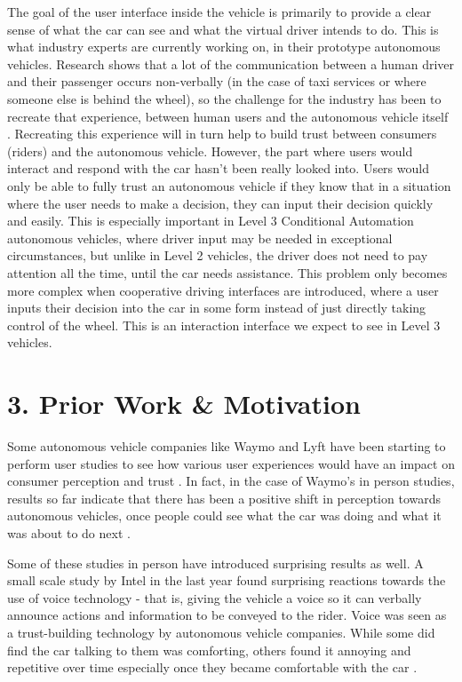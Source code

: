 \documentclass{sigchi}
\begin{document}
The goal of the user interface inside the vehicle is primarily to provide a clear sense of what the car can see and what the virtual driver intends to do. This is what industry experts are currently working on, in their prototype autonomous vehicles. Research shows that a lot of the communication between a human driver and their passenger occurs non-verbally (in the case of taxi services or where someone else is behind the wheel), so the challenge for the industry has been to recreate that experience, between human users and the autonomous vehicle itself \cite{etherington_2017}. Recreating this experience will in turn help to build trust between consumers (riders) and the autonomous vehicle. However, the part where users would interact and respond with the car hasn't been really looked into. Users would only be able to fully trust an autonomous vehicle if they know that in a situation where the user needs to make a decision, they can input their decision quickly and easily. This is especially important in Level 3 Conditional Automation autonomous vehicles, where driver input may be needed in exceptional circumstances, but unlike in Level 2 vehicles, the driver does not need to pay attention all the time, until the car needs assistance. This problem only becomes more complex when cooperative driving interfaces are introduced, where a user inputs their decision into the car in some form instead of just directly taking control of the wheel. This is an interaction interface we expect to see in Level 3 vehicles.

\section{3. Prior Work \& Motivation}

Some autonomous vehicle companies like Waymo and Lyft have been starting to perform user studies to see how various user experiences would have an impact on consumer perception and trust \cite{lyftdemo} \cite{etherington_2017}. In fact, in the case of Waymo's in person studies, results so far indicate that there has been a positive shift in perception towards autonomous vehicles, once people could see what the car was doing and what it was about to do next \cite{etherington_2017}.

Some of these studies in person have introduced surprising results as well. A small scale study by Intel in the last year found surprising reactions towards the use of voice technology - that is, giving the vehicle a voice so it can verbally announce actions and information to be conveyed to the rider. Voice was seen as a trust-building technology by autonomous vehicle companies. While some did find the car talking to them was comforting, others found it annoying and repetitive over time especially once they became comfortable with the car \cite{hutson_2017}.
\end{document}
